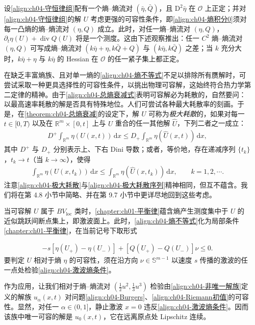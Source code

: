 \documentclass[../../main.tex]{subfiles}
\begin{document}
\begin{remark}\label{remark:ch04-多熵可容性}
设\eqref{align:ch04-守恒律组}配有一个熵--熵流对 $(\bar{\eta},\bar{Q})$，且 $\mathrm{D}^{2}\bar{\eta}$ 在 $\mathcal{O}$ 上正定；并对\eqref{align:ch04-守恒律组}的解 $U$ 考虑更强的可容性条件，即\eqref{align:ch04-熵积分0}须对每一凸熵的熵--熵流对 $(\eta,Q)$ 成立。此时，对任一熵--熵流对 $(\eta,Q)$，$\partial_{t}\eta(U)+\operatorname{div}Q(U)$ 将是一个测度。这由下述观察推出：任一 $C^{2}$ 熵--熵流对 $(\eta,Q)$ 可写成熵--熵流对 $(k\bar{\eta}+\eta,k\bar{Q}+Q)$ 与 $(k\bar{\eta},k\bar{Q})$ 之差；当 $k$ 充分大时，$k\bar{\eta}+\eta$ 与 $k\bar{\eta}$ 的 Hessian 在 $\mathcal{O}$ 的任一紧子集上都正定。
\end{remark}

在缺乏丰富熵族、且对单一熵的\eqref{align:ch04-熵不等式}不足以排除所有赝解时，可尝试采取一种更具选择性的可容性条件，以挑出物理可容解，这始终符合热力学第二定律的精神。由于\eqref{align:ch04-总熵衰减式}表明可容解必为耗散的，自然要问：以最高速率耗散的解是否具有特殊地位。人们可尝试各种最大耗散率的刻画。于是，在\cref{theorem:ch04-总熵衰减}的设定下，解 $U$ 可称为\emph{极大耗散}的，如果对每一 $t\in[0,T)$ 以及在 $\mathbb{R}^{m}\times[0,t]$ 上与 $U$ 重合的任一其他解 $\hat{U}$，下列二者之一成立：
\begin{align}
D^{+}\int_{\mathbb{R}^{m}}\eta(U(x,t))\,\mathrm{d}x\leqslant D_{+}\int_{\mathbb{R}^{m}}\eta(\hat{U}(x,t))\,\mathrm{d}x,
\label{align:ch04-极大耗散}
\end{align}
其中 $D^{+}$ 与 $D_{+}$ 分别表示上、下右 Dini 导数；或者，等价地，存在递减序列 $\{t_{k}\}$，$t_{k}\to t$（当 $k\to\infty$），使得
\begin{align}
\int_{\mathbb{R}^{m}}\eta(U(x,t_{k}))\,\mathrm{d}x\leqslant\int_{\mathbb{R}^{m}}\eta(\hat{U}(x,t_{k}))\,\mathrm{d}x,\qquad k=1,2,\cdots.
\label{align:ch04-极大耗散序列}
\end{align}
注意\eqref{align:ch04-极大耗散}与\eqref{align:ch04-极大耗散序列}精神相同，但互不蕴含。我们将在第 4.8 小节中简略、并在第 9.7 小节中更详尽地回到这些考虑。

当可容解 $U$ 属于 $BV_{\mathrm{loc}}$ 类时，\cref{chapter:ch01-平衡律}蕴含熵产生测度集中于 $U$ 的近似跳跃间断点集上，即激波面上。此时，\eqref{align:ch04-熵不等式}化为局部条件\cref{chapter:ch01-平衡律}，在当前记号下取形式

\begin{align}
-s[\eta(U_{+})-\eta(U_{-})]+[Q(U_{+})-Q(U_{-})]\nu\leqslant 0.
\label{align:ch04-激波熵条件}
\end{align}
要判定 $U$ 相对于熵 $\eta$ 的可容性，须在沿方向 $\nu\in\mathbb{S}^{m-1}$ 以速度 $s$ 传播的激波的任一点处检验\eqref{align:ch04-激波熵条件}。

作为应用，让我们相对于熵--熵流对 $(\tfrac{1}{2}u^{2},\tfrac{1}{3}u^{3})$ 检验由\eqref{align:ch04-非唯一解族}定义的解族 $u_{\alpha}(x,t)$ 对问题\eqref{align:ch04-Burgers}、\eqref{align:ch04-Riemann初值}的可容性。显然，对任一 $\alpha\in(0,1]$，静止激波 $x=0$ 违反\eqref{align:ch04-激波熵条件}。因而该族中唯一可容的解是 $u_{0}(x,t)$，它在远离原点处 Lipschitz 连续。
\end{document}
